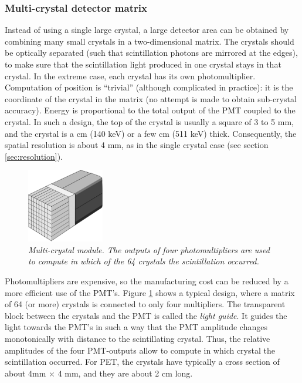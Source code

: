 \documentclass[11pt,oneside]{book}
\begin{document}
\subsubsection{Multi-crystal detector matrix}
Instead of using a single large crystal, a large detector area can be
obtained by combining many small crystals in a two-dimensional
matrix. The crystals should be optically separated (such that
scintillation photons are mirrored at the edges), to make sure that
the scintillation light produced in one crystal stays in that
crystal. In the extreme case, each crystal has its own
photomultiplier. Computation of position is ``trivial'' (although
complicated in practice): it is the coordinate of the crystal in the
matrix (no attempt is made to obtain sub-crystal accuracy). Energy is
proportional to the total output of the PMT coupled to the crystal. In
such a design, the top of the crystal is usually a square of 3 to 5
mm, and the crystal is a cm (140 keV) or a few cm (511 keV) thick.
Consequently, the spatial resolution is about 4 mm, as in the single
crystal case (see section \ref{sec:resolution}).

\begin{figure}[tb]
\centering
\includegraphics[width=0.3\textwidth]{figs/fig_multicrystal.pdf}
\caption{\label{fig:multicrystal} \emph{Multi-crystal module. The outputs
of four photomultipliers are used to compute in which of the 64 crystals
the scintillation occurred.}}
\end{figure}

Photomultipliers are expensive, so the manufacturing cost can be
reduced by a more efficient use of the PMT's. Figure
\ref{fig:multicrystal} shows a typical design, where a matrix of 64
(or more) crystals is connected to only four multipliers. The
transparent block between the crystals and the PMT is called the {\em
light guide}.  It guides the light towards the PMT's in such a way
that the PMT amplitude changes monotonically with distance to the
scintillating crystal. Thus, the relative amplitudes of the four
PMT-outputs allow to compute in which crystal the scintillation
occurred. For PET, the crystals have typically a cross section of
about 4mm $\times$ 4 mm, and they are about 2 cm long.
\end{document}
